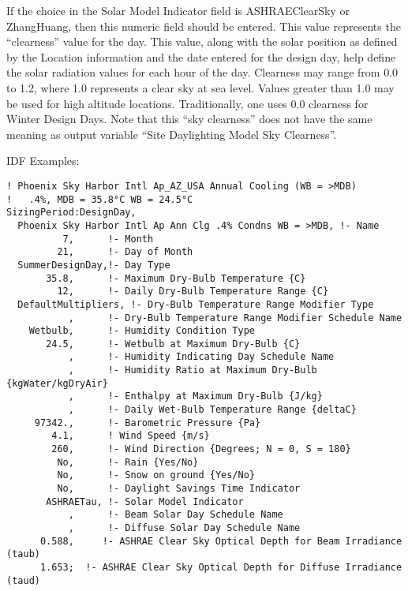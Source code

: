 If the choice in the Solar Model Indicator field is ASHRAEClearSky or ZhangHuang, then this numeric field should be entered. This value represents the ``clearness'' value for the day. This value, along with the solar position as defined by the Location information and the date entered for the design day, help define the solar radiation values for each hour of the day. Clearness may range from 0.0 to 1.2, where 1.0 represents a clear sky at sea level. Values greater than 1.0 may be used for high altitude locations. Traditionally, one uses 0.0 clearness for Winter Design Days. Note that this ``sky clearness'' does not have the same meaning as output variable ``Site Daylighting Model Sky Clearness''.

IDF Examples:

\begin{lstlisting}
! Phoenix Sky Harbor Intl Ap_AZ_USA Annual Cooling (WB = >MDB)
!   .4%, MDB = 35.8°C WB = 24.5°C
SizingPeriod:DesignDay,
  Phoenix Sky Harbor Intl Ap Ann Clg .4% Condns WB = >MDB, !- Name
          7,      !- Month
         21,      !- Day of Month
  SummerDesignDay,!- Day Type
       35.8,      !- Maximum Dry-Bulb Temperature {C}
         12,      !- Daily Dry-Bulb Temperature Range {C}
  DefaultMultipliers, !- Dry-Bulb Temperature Range Modifier Type
           ,      !- Dry-Bulb Temperature Range Modifier Schedule Name
    Wetbulb,      !- Humidity Condition Type
       24.5,      !- Wetbulb at Maximum Dry-Bulb {C}
           ,      !- Humidity Indicating Day Schedule Name
           ,      !- Humidity Ratio at Maximum Dry-Bulb {kgWater/kgDryAir}
           ,      !- Enthalpy at Maximum Dry-Bulb {J/kg}
           ,      !- Daily Wet-Bulb Temperature Range {deltaC}
     97342.,      !- Barometric Pressure {Pa}
        4.1,      ! Wind Speed {m/s}
        260,      !- Wind Direction {Degrees; N = 0, S = 180}
         No,      !- Rain {Yes/No}
         No,      !- Snow on ground {Yes/No}
         No,      !- Daylight Savings Time Indicator
       ASHRAETau, !- Solar Model Indicator
           ,      !- Beam Solar Day Schedule Name
           ,      !- Diffuse Solar Day Schedule Name
      0.588,     !- ASHRAE Clear Sky Optical Depth for Beam Irradiance (taub)
      1.653;  !- ASHRAE Clear Sky Optical Depth for Diffuse Irradiance (taud)


\end{lstlisting}
